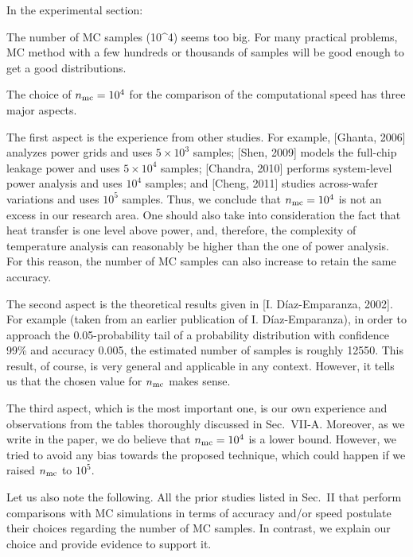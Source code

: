 \begin{reviewer}
In the experimental section:

The number of MC samples (10\^{}4) seems too big. For many practical problems, MC method with a few hundreds or thousands of samples will be good enough to get a good distributions.
\end{reviewer}
\begin{authors}
The choice of ${n_\text{mc}} = 10^4$ for the comparison of the computational speed has three major aspects.

The first aspect is the experience from other studies.
For example, [Ghanta, 2006] analyzes power grids and uses $5 \times 10^3$ samples; [Shen, 2009] models the full-chip leakage power and uses $5 \times 10^4$ samples; [Chandra, 2010] performs system-level power analysis and uses $10^4$ samples; and [Cheng, 2011] studies across-wafer variations and uses $10^5$ samples.
Thus, we conclude that ${n_\text{mc}} = 10^4$ is not an excess in our research area.
One should also take into consideration the fact that heat transfer is one level above power, and, therefore, the complexity of temperature analysis can reasonably be higher than the one of power analysis.
For this reason, the number of MC samples can also increase to retain the same accuracy.

The second aspect is the theoretical results given in [I. D\'{i}az-Emparanza, 2002].
For example (taken from an earlier publication of I. D\'{i}az-Emparanza), in order to approach the 0.05-probability tail of a probability distribution with confidence 99\% and accuracy 0.005, the estimated number of samples is roughly 12550.
This result, of course, is very general and applicable in any context.
However, it tells us that the chosen value for ${n_\text{mc}}$ makes sense.

The third aspect, which is the most important one, is our own experience and observations from the tables thoroughly discussed in Sec.~VII-A.
Moreover, as we write in the paper, we do believe that ${n_\text{mc}} = 10^4$ is a lower bound.
However, we tried to avoid any bias towards the proposed technique, which could happen if we raised ${n_\text{mc}}$ to $10^5$.

Let us also note the following.
All the prior studies listed in Sec.~II that perform comparisons with MC simulations in terms of accuracy and/or speed postulate their choices regarding the number of MC samples.
In contrast, we explain our choice and provide evidence to support it.

\end{authors}

